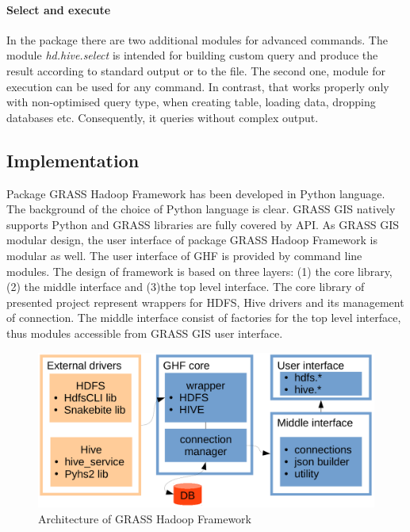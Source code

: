 \documentclass[a4paper,12pt,oneside]{report}
\begin{document}
    \paragraph{Select and execute} In the package there are two additional modules for
    advanced commands. The module \textit{hd.hive.select} is intended for building custom query
    and produce the result according to standard  output or to the file. The second one, module for
    execution can be used for any command. In contrast, that works properly only with
    non-optimised query type, when creating table, loading data, dropping databases
    etc.  Consequently, it queries without complex output.
	
		
	\subsection{Implementation}
	Package GRASS Hadoop Framework has been developed in Python language. The
	background of the choice of Python language is clear. GRASS GIS natively
	supports Python and GRASS libraries are fully covered by API. As GRASS GIS modular design, the
	user interface of package GRASS Hadoop Framework is modular as well. The user
	interface of GHF is provided by command line modules. 
	The design of framework is based on three layers: (1) the core library, (2) the middle
	interface and  (3)the top level interface. The core library of presented project represent
	wrappers for HDFS, Hive drivers and its management of connection. The middle
	interface consist of factories for the top level interface, thus modules accessible
	from GRASS GIS user interface.
	
	\begin{figure}[!htbp]
		\centering
		\includegraphics[width=1\textwidth]{./img/implementation.pdf}
		\caption[Architecture of GHF]{\centering Architecture of GRASS Hadoop
			Framework}
	\end{figure} 
	
\end{document}
